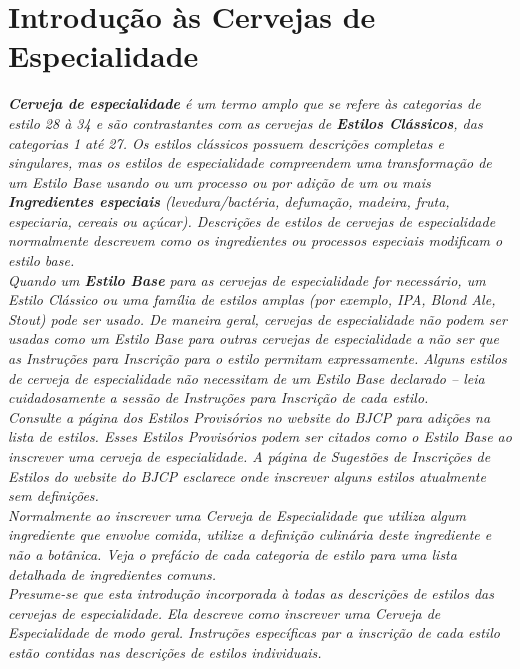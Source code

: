 \section*{Introdução às Cervejas de Especialidade}
\textit{\textbf{Cerveja de especialidade} é um termo amplo que se refere às categorias de estilo 28 à 34 e são contrastantes com as cervejas de \textbf{Estilos Clássicos}, das categorias 1 até 27. Os estilos clássicos possuem descrições completas e singulares, mas os estilos de especialidade compreendem uma transformação de um Estilo Base usando ou um processo ou por adição de um ou mais \textbf{Ingredientes especiais} (levedura/bactéria, defumação, madeira, fruta, especiaria, cereais ou açúcar). Descrições de estilos de cervejas de especialidade normalmente descrevem como os ingredientes ou processos especiais modificam o estilo base.}\\
\textit{Quando um \textbf{Estilo Base} para as cervejas de especialidade for necessário, um Estilo Clássico ou uma família de estilos amplas (por exemplo, IPA, Blond Ale, Stout) pode ser usado. De maneira geral, cervejas de especialidade não podem ser usadas como um Estilo Base para outras cervejas de especialidade a não ser que as Instruções para Inscrição para o estilo permitam expressamente. Alguns estilos de cerveja de especialidade não necessitam de um Estilo Base declarado – leia cuidadosamente a sessão de Instruções para Inscrição de cada estilo.}\\
\textit{Consulte a página dos Estilos Provisórios no website do BJCP para adições na lista de estilos. Esses Estilos Provisórios podem ser citados como o Estilo Base ao inscrever uma cerveja de especialidade. A página de Sugestões de Inscrições de Estilos do website do BJCP esclarece onde inscrever alguns estilos atualmente sem definições.}\\
\textit{Normalmente ao inscrever uma Cerveja de Especialidade que utiliza algum ingrediente que envolve comida, utilize a definição culinária deste ingrediente e não a botânica. Veja o prefácio de cada categoria de estilo para uma lista detalhada de ingredientes comuns. }\\
\textit{Presume-se que esta introdução incorporada à todas as descrições de estilos das cervejas de especialidade. Ela descreve como inscrever uma Cerveja de Especialidade de modo geral. Instruções específicas par a inscrição de cada estilo estão contidas nas descrições de estilos individuais.}\\